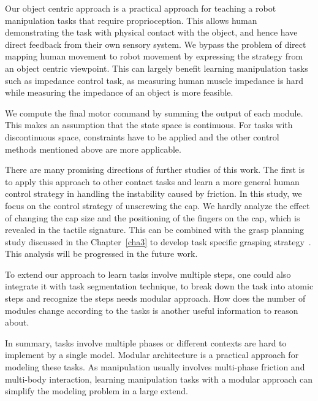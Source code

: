 Our object centric approach is a practical approach for teaching a robot manipulation tasks that require proprioception. This allows human demonstrating the task with physical contact with the object, and hence have direct feedback from their own sensory system. We bypass the problem of direct mapping human movement to robot movement by expressing the strategy from an object centric viewpoint. This can largely benefit learning manipulation tasks such as impedance control task, as measuring human muscle impedance is hard while measuring the impedance of an object is more feasible.

We compute the final motor command by summing the output of each module. This makes an assumption that the state space is continuous. For tasks with discontinuous space, constraints have to be applied and the other control methods mentioned above are more applicable.

There are many promising directions of further studies of this work. The first is to apply this approach to other contact tasks and learn a more general human control strategy in handling the instability caused by friction.
In this study, we focus on the control strategy of unscrewing the cap. We hardly analyze the effect of changing the cap size and the positioning of the fingers on the cap, which is revealed in the tactile signature. This can be combined with the grasp planning study discussed in the Chapter~\ref{cha3} to develop task specific grasping strategy~\citep{el2013generation,dang2014semantic}. This analysis will be progressed in the future work.

To extend our approach to learn tasks involve multiple steps, one could also integrate it with task segmentation technique, to break down the task into atomic steps and recognize the steps needs modular approach. How does the number of modules change according to the tasks is another useful information to reason about.


In summary, tasks involve multiple phases or different contexts are hard to implement by a single model. Modular architecture is a practical approach for modeling these tasks. As manipulation usually involves multi-phase friction and multi-body interaction, learning manipulation tasks with a modular approach can simplify the modeling problem in a large extend.


